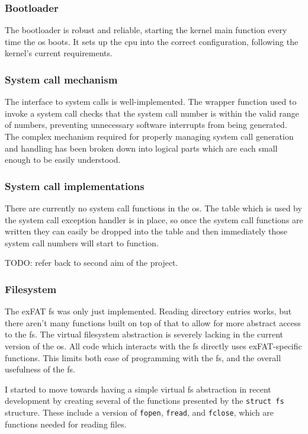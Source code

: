 \documentclass{article}
\begin{document}
\subsubsection{Bootloader}
The bootloader is robust and reliable, starting the kernel main function every
time the \gls{os} boots. It sets up the \gls{cpu} into the correct
configuration, following the kernel's current requirements.

\subsubsection{System call mechanism}
The interface to system calls is well-implemented. The wrapper function used to
invoke a system call checks that the system call number is within the valid
range of numbers, preventing unnecessary software interrupts from being
generated. The complex mechanism required for properly managing system call
generation and handling has been broken down into logical parts which are each
small enough to be easily understood.

\subsubsection{System call implementations}
\label{sec:eval_no_syscalls}
There are currently no system call functions in the \gls{os}. The table which
is used by the system call exception handler is in place, so once the system
call functions are written they can easily be dropped into the table and then
immediately those system call numbers will start to function.

TODO: refer back to second aim of the project.

\subsubsection{Filesystem}
The exFAT \gls{fs} was only just implemented. Reading directory entries works,
but there aren't many functions built on top of that to allow for more abstract
access to the \gls{fs}. The virtual filesystem abstraction is severely lacking
in the current version of the \gls{os}. All code which interacts with the
\gls{fs} directly uses exFAT-specific functions. This limits both ease of
programming with the \gls{fs}, and the overall usefulness of the \gls{fs}.

I started to move towards having a simple virtual \gls{fs} abstraction in
recent development by creating several of the functions presented by the
\verb!struct fs! structure. These include a version of \texttt{fopen},
\texttt{fread}, and \texttt{fclose}, which are functions needed for reading
files.
\end{document}
